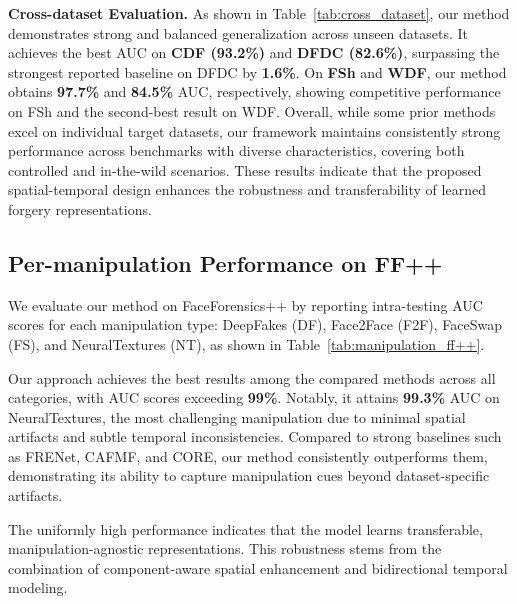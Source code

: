 \documentclass[runningheads]{llncs}
\begin{document}
\textbf{Cross-dataset Evaluation.}
As shown in Table~\ref{tab:cross_dataset}, our method demonstrates strong and balanced generalization across unseen datasets.
It achieves the best AUC on \textbf{CDF (93.2\%)} and \textbf{DFDC (82.6\%)}, surpassing the strongest reported baseline on DFDC by \textbf{1.6\%}.
On \textbf{FSh} and \textbf{WDF}, our method obtains \textbf{97.7\%} and \textbf{84.5\%} AUC, respectively, showing competitive performance on FSh and the second-best result on WDF.
Overall, while some prior methods excel on individual target datasets, our framework maintains consistently strong performance across benchmarks with diverse characteristics, covering both controlled and in-the-wild scenarios.
These results indicate that the proposed spatial-temporal design enhances the robustness and transferability of learned forgery representations.



\subsection{Per-manipulation Performance on FF++}

We evaluate our method on FaceForensics++ by reporting intra-testing AUC scores for each manipulation type: DeepFakes (DF), Face2Face (F2F), FaceSwap (FS), and NeuralTextures (NT), as shown in Table~\ref{tab:manipulation_ff++}.

Our approach achieves the best results among the compared methods across all categories, with AUC scores exceeding \textbf{99\%}.
Notably, it attains \textbf{99.3\%} AUC on NeuralTextures, the most challenging manipulation due to minimal spatial artifacts and subtle temporal inconsistencies.
Compared to strong baselines such as FRENet, CAFMF, and CORE, our method consistently outperforms them, demonstrating its ability to capture manipulation cues beyond dataset-specific artifacts.

The uniformly high performance indicates that the model learns transferable, manipulation-agnostic representations.
This robustness stems from the combination of component-aware spatial enhancement and bidirectional temporal modeling.
\end{document}
